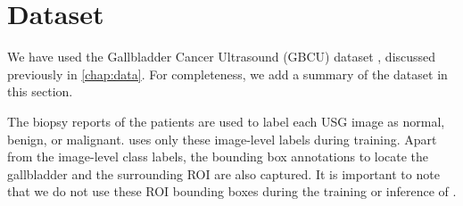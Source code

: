 %
%
\section{Dataset}
We have used the Gallbladder Cancer Ultrasound (GBCU) dataset \cite{basu2022surpassing}, discussed previously in \cref{chap:data}. For completeness, we add a summary of the dataset in this section.


The biopsy reports of the patients are used to label each USG image as normal, benign, or malignant. \radformer uses only these image-level labels during training. Apart from the image-level class labels, the bounding box annotations to locate the gallbladder and the surrounding ROI are also captured. It is important to note that we do not use these ROI bounding boxes during the training or inference of \radformer. 

